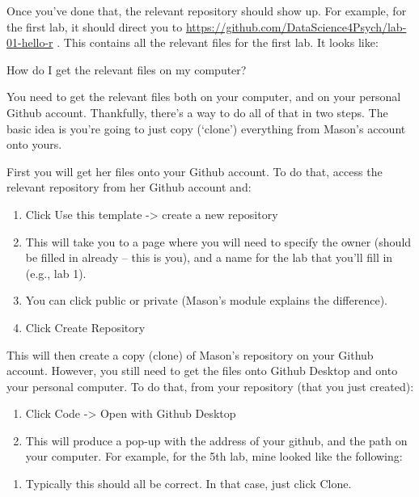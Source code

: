 \documentclass[
]{article}
\providecommand{\tightlist}{%
  \setlength{\itemsep}{0pt}\setlength{\parskip}{0pt}}
\begin{document}
Once you've done that, the relevant repository should show up. For
example, for the first lab, it should direct you to
\url{https://github.com/DataScience4Psych/lab-01-hello-r} . This
contains all the relevant files for the first lab. It looks like:

How do I get the relevant files on my computer?

You need to get the relevant files both on your computer, and on your
personal Github account. Thankfully, there's a way to do all of that in
two steps. The basic idea is you're going to just copy (`clone')
everything from Mason's account onto yours.

First you will get her files onto your Github account. To do that,
access the relevant repository from her Github account and:

\begin{enumerate}
\def\labelenumi{\arabic{enumi}.}
\tightlist
\item
  Click Use this template -\textgreater{} create a new repository
\item
  This will take you to a page where you will need to specify the owner
  (should be filled in already -- this is you), and a name for the lab
  that you'll fill in (e.g., lab 1).
\item
  You can click public or private (Mason's module explains the
  difference).
\item
  Click Create Repository
\end{enumerate}

This will then create a copy (clone) of Mason's repository on your
Github account. However, you still need to get the files onto Github
Desktop and onto your personal computer. To do that, from your
repository (that you just created):

\begin{enumerate}
\def\labelenumi{\arabic{enumi}.}
\tightlist
\item
  Click Code -\textgreater{} Open with Github Desktop
\item
  This will produce a pop-up with the address of your github, and the
  path on your computer. For example, for the 5th lab, mine looked like
  the following:
\end{enumerate}

\begin{enumerate}
\def\labelenumi{\arabic{enumi}.}
\setcounter{enumi}{2}
\tightlist
\item
  Typically this should all be correct. In that case, just click Clone.
\end{enumerate}
\end{document}
